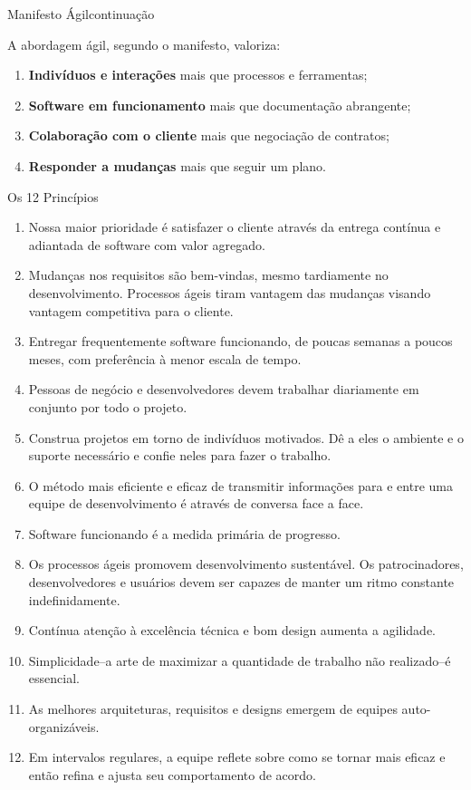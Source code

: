 \begin{frame}{Manifesto Ágil}{\tiny continuação}

  A abordagem ágil, segundo o manifesto, valoriza:
  \begin{enumerate}[<+-| alert@+>]
  \item {\bf Indivíduos e interações} mais que processos e ferramentas;
  \item {\bf Software em funcionamento} mais que documentação abrangente;
  \item {\bf Colaboração com o cliente} mais que negociação de contratos;
  \item {\bf Responder a mudanças} mais que seguir um plano.
  \end{enumerate}
\end{frame}

\begin{frame}{Os 12 Princípios}{\insertlecture}\scriptsize
  \begin{enumerate}[<+-| alert@+>]
  \item Nossa maior prioridade é satisfazer o cliente
através da entrega contínua e adiantada
de software com valor agregado.
  \item Mudanças nos requisitos são bem-vindas, 
mesmo tardiamente no desenvolvimento. 
Processos ágeis tiram vantagem das 
mudanças visando vantagem competitiva para o cliente.
  \item Entregar frequentemente software funcionando, 
de poucas semanas a poucos meses, 
com preferência à menor escala de tempo.
  \item Pessoas de negócio e desenvolvedores devem trabalhar 
diariamente em conjunto por todo o projeto.
  \item Construa projetos em torno de indivíduos motivados. 
Dê a eles o ambiente e o suporte necessário 
e confie neles para fazer o trabalho.
  \item O método mais eficiente e eficaz de transmitir 
informações para e entre uma equipe de desenvolvimento
é através de conversa face a face.
  \item Software funcionando é a medida primária de progresso.
  \item Os processos ágeis promovem desenvolvimento 
sustentável. Os patrocinadores, desenvolvedores e 
usuários devem ser capazes de manter um ritmo 
constante indefinidamente.
  \item Contínua atenção à excelência técnica e bom design 
aumenta a agilidade.
  \item Simplicidade--a arte de maximizar a quantidade de 
trabalho não realizado--é essencial.
  \item As melhores arquiteturas, requisitos e designs 
emergem de equipes auto-organizáveis.
  \item Em intervalos regulares, a equipe reflete sobre como 
se tornar mais eficaz e então refina e ajusta seu 
comportamento de acordo.
  \end{enumerate}
  \end{frame}

